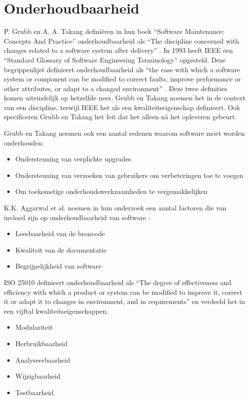 \section{Onderhoudbaarheid} \label{onderhoudbaarheid}
P. Grubb en A. A. Takang definiëren in hun boek \enquote{Software Maintenance: Concepts And Practice} onderhoudbaarheid als \enquote{The discipline concerned with changes related to a software system after delivery} \parencite{MaintenanceConcepts}. In 1993 heeft IEEE een \enquote{Standard Glossary of Software Engineering Terminology} opgesteld. Deze begrippenlijst definieert onderhoudbaarheid als \enquote{the ease with which a software system or component can be modified to correct faults, improve performance or other attributes, or adapt to a changed environment} \parencite{SENTerminology}. Deze twee definities komen uiteindelijk op hetzelfde neer. Grubb en Takang noemen het in de context van een discipline, terwijl IEEE het als een kwaliteitseigenschap definieert. Ook specificeren Grubb en Takang het feit dat het alleen ná het opleveren gebeurt.

Grubb en Takang noemen ook een aantal redenen waarom software moet worden onderhouden:
\begin{itemize}
	\item Ondersteuning van verplichte upgrades
	\item Ondersteuning van verzoeken van gebruikers om verbeteringen toe te voegen
	\item Om toekomstige onderhoudswerkzaamheden te vergemakkelijken
\end{itemize}

K.K. Aggarwal et al. noemen in hun onderzoek een aantal factoren die van invloed zijn op onderhoudbaarheid van software \parencite{MaintainabilityMeasure}:
\begin{itemize}
	\item Leesbaarheid van de broncode
	\item Kwaliteit van de documentatie
	\item Begrijpelijkheid van software
\end{itemize}

ISO 25010 \parencite{ISO25010} definieert onderhoudbaarheid als \enquote{The degree of effectiveness and efficiency with which a product or system can be modified to improve it, correct it or adapt it to changes in environment, and in requirements} en verdeeld het in een vijftal kwaliteitseigenschappen.
\begin{itemize}
	\item Modulariteit
	\item Herbruikbaarheid
	\item Analyseerbaarheid
	\item Wijzigbaarheid
	\item Testbaarheid
\end{itemize}

